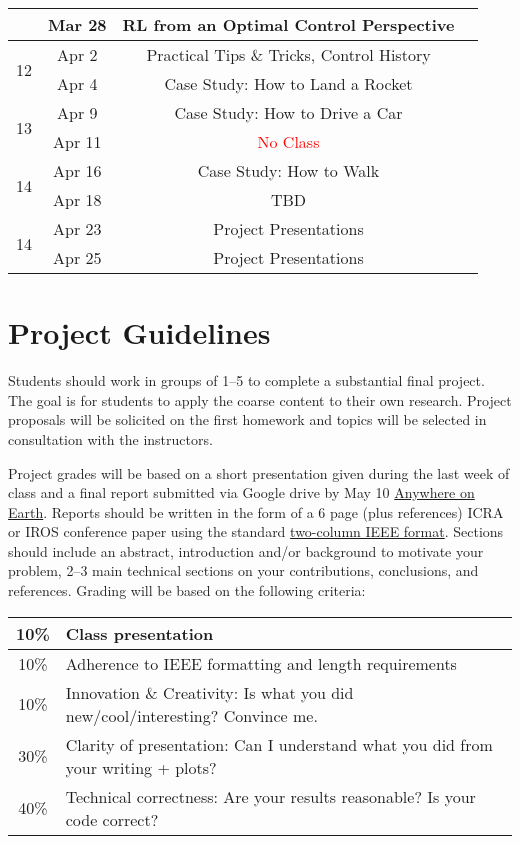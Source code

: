 \documentclass[11pt,letterpaper]{article}
\begin{document}
\begin{tabular}{c|c|c|c}
	 & Mar 28 & RL from an Optimal Control Perspective &   \\
	 \hline
	\multirow{2}{*}{12}  & Apr 2 & Practical Tips \& Tricks, Control History 
         &   \\
	 & Apr 4 & Case Study: How to Land a Rocket &   \\
	 \hline
	\multirow{2}{*}{13}  & Apr 9 & Case Study: How to Drive a Car
         &  \\
	 & Apr 11 & \textcolor{red}{No Class} &   \\
	 \hline
	\multirow{2}{*}{14}  & Apr 16 & Case Study: How to Walk
         &  \\
	 & Apr 18 &  TBD &   \\
	 \hline
	\multirow{2}{*}{14}  & Apr 23 &
        Project Presentations &  \\
	 & Apr 25 & Project Presentations &   \\
\end{tabular}


\section*{Project Guidelines}

Students should work in groups of 1--5 to complete a substantial final project. The goal is for students to apply the coarse content to their own research. Project proposals will be solicited on the first homework and topics will be selected in consultation with the instructors.

\medskip
\noindent
Project grades will be based on a short presentation given during the last week of class and a final report submitted via Google drive by May 10 \href{https://time.is/Anywhere_on_Earth}{Anywhere on Earth}. Reports should be written in the form of a 6 page (plus references) ICRA or IROS conference paper using the standard \href{https://www.ieee.org/conferences/publishing/templates.html}{two-column IEEE format}. Sections should include an abstract, introduction and/or background to motivate your problem, 2--3 main technical sections on your contributions, conclusions, and references. Grading will be based on the following criteria:
\newline
\newline
\begin{tabular}{|c|l|}
\hline
10\% & Class presentation \\
\hline
10\% & Adherence to IEEE formatting and length requirements \\
\hline
10\% & Innovation \& Creativity: Is what you did new/cool/interesting? Convince me. \\
\hline
30\% & Clarity of presentation: Can I understand what you did from your writing + plots? \\
\hline
40\% & Technical correctness: Are your results reasonable? Is your code correct? \\
\hline	
\end{tabular}
\end{document}
